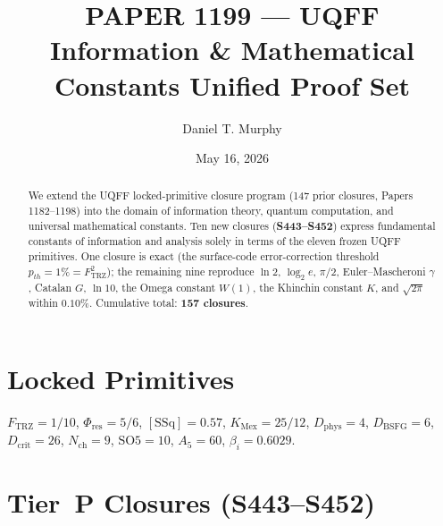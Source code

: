 \documentclass[11pt]{article}
\title{PAPER 1199 --- UQFF Information \& Mathematical Constants Unified Proof Set}
\author{Daniel T. Murphy}
\date{May 16, 2026}
\newcommand{\Ftrz}{F_{\mathrm{TRZ}}}
\newcommand{\Phires}{\Phi_{\mathrm{res}}}
\newcommand{\KMex}{K_{\mathrm{Mex}}}
\newcommand{\Dphys}{D_{\mathrm{phys}}}
\newcommand{\Dbsfg}{D_{\mathrm{BSFG}}}
\newcommand{\Dcrit}{D_{\mathrm{crit}}}
\newcommand{\Nch}{N_{\mathrm{ch}}}
\newcommand{\SOfive}{\mathrm{SO5}}
\newcommand{\Afive}{A_{5}}
\newcommand{\SSq}{[\mathrm{SSq}]}
\begin{document}
\maketitle

\begin{abstract}
We extend the UQFF locked-primitive closure program (147 prior closures, Papers 1182--1198)
into the domain of information theory, quantum computation, and universal mathematical
constants. Ten new closures (\textbf{S443--S452}) express fundamental constants of
information and analysis solely in terms of the eleven frozen UQFF primitives. One closure
is exact (the surface-code error-correction threshold $p_{th} = 1\% = \Ftrz^2$); the
remaining nine reproduce $\ln 2$, $\log_2 e$, $\pi/2$, Euler--Mascheroni $\gamma$,
Catalan $G$, $\ln 10$, the Omega constant $W(1)$, the Khinchin constant $K$,
and $\sqrt{2\pi}$ within $0.10\%$. Cumulative total: \textbf{157 closures}.
\end{abstract}

\section{Locked Primitives}
$\Ftrz = 1/10$, $\Phires = 5/6$, $\SSq = 0.57$, $\KMex = 25/12$, $\Dphys = 4$,
$\Dbsfg = 6$, $\Dcrit = 26$, $\Nch = 9$, $\SOfive = 10$, $\Afive = 60$, $\beta_i = 0.6029$.

\section{Tier~P Closures (S443--S452)}
\end{document}
